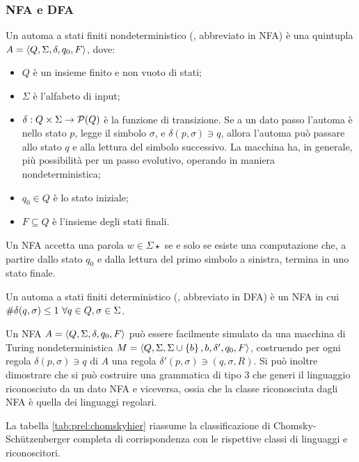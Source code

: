 \subsubsection{NFA e DFA}
\begin{defin}
	Un automa a stati finiti nondeterministico (, abbreviato in NFA) è una quintupla $A=\langle Q,\Sigma,\delta,q_0,F \rangle$, dove:
	\begin{itemize}
		\item $Q$ è un insieme finito e non vuoto di stati;
		\item $\Sigma$ è l'alfabeto di input;
		\item $\delta:Q\times\Sigma\to\mathcal P(Q)$ è la funzione di transizione. Se a un dato passo l'automa è nello stato $p$, legge il simbolo $\sigma$, e $\delta(p,\sigma)\ni q$, allora l'automa può passare allo stato $q$ e alla lettura del simbolo successivo. La macchina ha, in generale, più possibilità per un passo evolutivo, operando in maniera nondeterministica;
		\item $q_0\in Q$ è lo stato iniziale;
		\item $F\subseteq Q$ è l'insieme degli stati finali.
	\end{itemize}
	Un NFA accetta una parola $w\in\Sigma\star$ se e solo se esiste una computazione che, a partire dallo stato $q_0$ e dalla lettura del primo simbolo a sinistra, termina in uno stato finale.
\end{defin}
\begin{defin}
	Un automa a stati finiti deterministico (, abbreviato in DFA) è un NFA in cui $\# \delta(q,\sigma)\leq 1 ~ \forall q\in Q,\sigma\in\Sigma$.
\end{defin}

Un NFA $A=\langle Q,\Sigma,\delta,q_0,F \rangle$ può essere facilmente simulato da una macchina di Turing nondeterministica $M=\langle Q,\Sigma,\Sigma\cup\left\{ b \right\},b,\delta',q_0,F \rangle$, costruendo per ogni regola $\delta(p,\sigma)\ni q$ di $A$ una regola $\delta'(p,\sigma)\ni (q,\sigma,R)$. Si può inoltre dimostrare che si può costruire una grammatica di tipo 3 che generi il linguaggio riconosciuto da un dato NFA e viceversa, ossia che la classe riconosciuta dagli NFA è quella dei linguaggi regolari.

La tabella \ref{tab:prel:chomskyhier} riassume la classificazione di Chomsky-Schützenberger completa di corrispondenza con le rispettive classi di linguaggi e riconoscitori.

